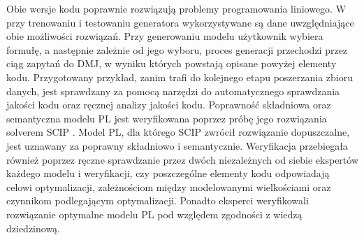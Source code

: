 Obie wersje kodu poprawnie rozwiązują problemy programowania liniowego. W przy trenowaniu i testowaniu generatora wykorzystywane są dane uwzględniające obie możliwości rozwiązań. Przy generowaniu modelu  użytkownik wybiera formułę, a następnie zależnie od jego wyboru, proces generacji przechodzi przez ciąg zapytań do DMJ, w wyniku których powstają opisane powyżej elementy kodu. %
Przygotowany przykład, zanim trafi do kolejnego etapu poszerzania zbioru danych, jest sprawdzany za pomocą narzędzi do automatycznego sprawdzania jakości kodu oraz ręcznej analizy jakości kodu. Poprawność składniowa oraz semantyczna modelu PL jest weryfikowana poprzez próbę jego rozwiązania solverem SCIP \cite{scip_documentation}. Model PL, dla którego SCIP zwrócił rozwiązanie dopuszczalne, jest uznawany za poprawny składniowo i semantycznie. Weryfikacja przebiegała również poprzez ręczne sprawdzanie przez dwóch niezależnych od siebie ekspertów każdego modelu i weryfikacji, czy poszczególne elementy kodu odpowiadają celowi optymalizacji, zależnościom między modelowanymi wielkościami oraz czynnikom podlegającym optymalizacji. Ponadto eksperci weryfikowali rozwiązanie optymalne modelu PL pod względem zgodności z wiedzą dziedzinową.


